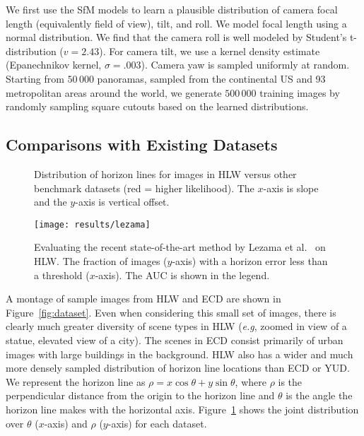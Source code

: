 \documentclass{bmvc2k}
\makeatletter
\newcommand{\figref}[1]{Figure~\ref{fig:#1}}
\newcommand*{\eg}{e.g.\@\xspace}
\def\eg{\emph{e.g}\bmvaOneDot}
\makeatother
\begin{document}
We first use the SfM models to learn a
plausible distribution of camera focal length (equivalently field of
view), tilt, and roll.  We model focal length using a normal
distribution. We find that the camera roll is well modeled by
Student's t-distribution ($v=2.43$). For camera tilt, we use a kernel
density estimate (Epanechnikov kernel, $\sigma=.003$).  Camera yaw is
sampled uniformly at random. Starting from $50\,000$ panoramas,
sampled from the continental US and 93 metropolitan areas around the
world, we generate $500\,000$ training images by randomly sampling
square cutouts based on the learned distributions. 

\subsection{Comparisons with Existing Datasets}
\label{sec:comparison}

\begin{figure}

  \centering
 

  \caption{Distribution of horizon lines for images in HLW versus
  other benchmark datasets (red = higher likelihood). The $x$-axis is
slope and the $y$-axis is vertical offset.}

  \label{fig:horizon_dists}

\end{figure}

\begin{wrapfigure}{R}{.54\linewidth}
  
  \centering
  
  \texttt{[image: results/lezama]}

  \caption{Evaluating the recent state-of-the-art method by
    Lezama et al.~\cite{lezama2014finding} on HLW. The fraction of
    images ($y$-axis) with a horizon error less than a threshold
    ($x$-axis). The AUC is shown in the legend.}
 
  \label{fig:hlw_results}
\end{wrapfigure}

A montage of sample images from HLW and ECD are shown in \figref{dataset}. Even when considering this
small set of images, there is clearly much greater diversity of scene
types in HLW (\eg, zoomed in view of a statue, elevated view of a
city). The scenes in ECD consist primarily of urban images with large
buildings in the background. HLW also has a wider and much more
densely sampled distribution of horizon line locations than ECD or
YUD. We represent the horizon line as $\rho = x \cos \theta + y \sin
\theta$, where $\rho$ is the perpendicular distance from the origin to
the horizon line and $\theta$ is the angle the horizon line makes with the horizontal
axis. \figref{horizon_dists} shows the joint distribution over
$\theta$ ($x$-axis) and $\rho$ ($y$-axis) for each dataset.
\end{document}
